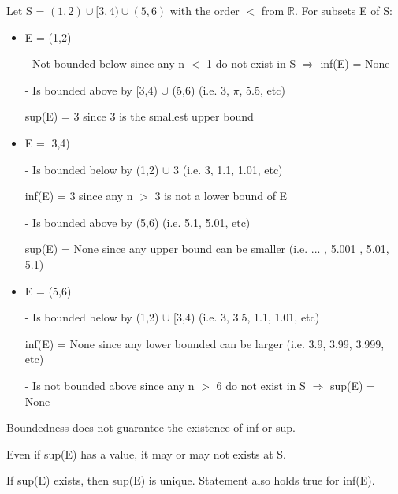 	\begin{example}
		Let S = $ (1,2) \cup [3,4) \cup (5,6) $ with the
		order $ < $ from $ \mathbb{R} $. For subsets E of S:

		\begin{itemize}[leftmargin=0cm, itemsep=0.1cm]
			\item E = (1,2)
				
				- Not bounded below since any n $<$ 1 do not exist in S
				\hspace{0.5cm}
				$\Rightarrow$
				\hspace{0.5cm}
				inf(E) = None
		
				- Is bounded above by [3,4) $\cup$ (5,6)
				\hspace{0.5cm}
				(i.e. 3, $\pi$, 5.5, etc)

				\hspace{0.2cm}
				sup(E) = 3 since 3 is the smallest upper bound

			\item E = [3,4)
			
				- Is bounded below by (1,2) $\cup$ 3
				\hspace{0.5cm}
				(i.e. 3, 1.1, 1.01, etc)
				
				\hspace{0.2cm}
				inf(E) = 3 since any n $>$ 3 is not a lower bound of E 
				
				- Is bounded above by (5,6)
				\hspace{0.5cm}
				(i.e. 5.1, 5.01, etc)

				\hspace{0.2cm}
				sup(E) = None since any upper bound can be smaller
				(i.e. ... , 5.001 , 5.01, 5.1)

			\item E = (5,6)
			
				- Is bounded below by (1,2) $\cup$ [3,4)
				\hspace{0.5cm}
				(i.e. 3, 3.5, 1.1, 1.01, etc)
			
				\hspace{0.2cm}
				inf(E) = None since any lower bounded can be larger
				(i.e. 3.9, 3.99, 3.999, etc)

				- Is not bounded above since any n $>$ 6 do not exist in S
				\hspace{0.5cm}
				$\Rightarrow$
				\hspace{0.5cm}
				sup(E) = None
		\end{itemize}

		\vspace{0.5cm}


		Boundedness does not guarantee the existence of inf or sup.

		Even if sup(E) has a value, it may or may not exists at S.

		If sup(E) exists, then sup(E) is unique.
		Statement also holds true for inf(E).
	\end{example}

